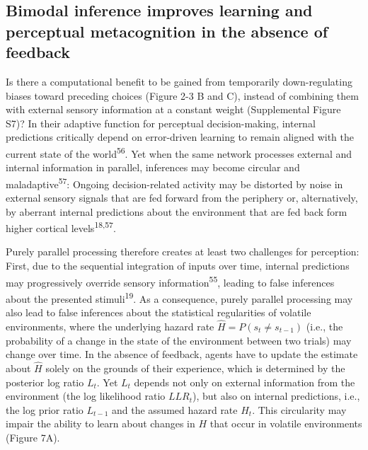 \documentclass[
]{article}
\begin{document}
\hypertarget{bimodal-inference-improves-learning-and-perceptual-metacognition-in-the-absence-of-feedback}{%
\subsection{Bimodal inference improves learning and perceptual
metacognition in the absence of
feedback}\label{bimodal-inference-improves-learning-and-perceptual-metacognition-in-the-absence-of-feedback}}

Is there a computational benefit to be gained from temporarily
down-regulating biases toward preceding choices (Figure 2-3 B and C),
instead of combining them with external sensory information at a
constant weight (Supplemental Figure S7)? In their adaptive function for
perceptual decision-making, internal predictions critically depend on
error-driven learning to remain aligned with the current state of the
world\textsuperscript{56}. Yet when the same network processes external
and internal information in parallel, inferences may become circular and
maladaptive\textsuperscript{57}: Ongoing decision-related activity may
be distorted by noise in external sensory signals that are fed forward
from the periphery or, alternatively, by aberrant internal predictions
about the environment that are fed back form higher cortical
levels\textsuperscript{18,57}.

Purely parallel processing therefore creates at least two challenges for
perception: First, due to the sequential integration of inputs over
time, internal predictions may progressively override sensory
information\textsuperscript{55}, leading to false inferences about the
presented stimuli\textsuperscript{19}. As a consequence, purely parallel
processing may also lead to false inferences about the statistical
regularities of volatile environments, where the underlying hazard rate
\(\hat{H} = P(s_t \neq s_{t-1})\) (i.e., the probability of a change in
the state of the environment between two trials) may change over time.
In the absence of feedback, agents have to update the estimate about
\(\hat{H}\) solely on the grounds of their experience, which is
determined by the posterior log ratio \(L_t\). Yet \(L_t\) depends not
only on external information from the environment (the log likelihood
ratio \(LLR_t\)), but also on internal predictions, i.e., the log prior
ratio \(L_{t-1}\) and the assumed hazard rate \(H_t\). This circularity
may impair the ability to learn about changes in \(H\) that occur in
volatile environments (Figure 7A).
\end{document}

